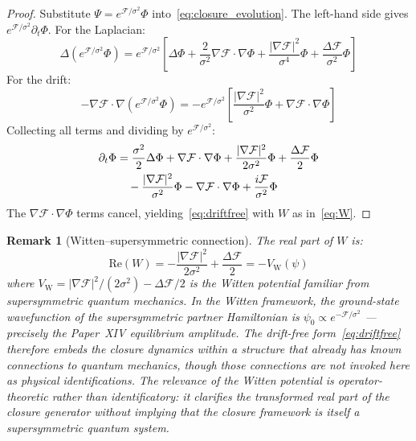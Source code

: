 \documentclass[12pt]{article}
\newtheorem{remark}[theorem]{Remark}
\newcommand{\Fcal}{\mathcal{F}}
\begin{document}
\begin{proof}
Substitute $\Psi = e^{\Fcal/\sigma^2}\Phi$ into~\eqref{eq:closure_evolution}. The left-hand side gives $e^{\Fcal/\sigma^2}\partial_t\Phi$. For the Laplacian:
\begin{equation}
    \Delta(e^{\Fcal/\sigma^2}\Phi) = e^{\Fcal/\sigma^2}\!\left[\Delta\Phi + \frac{2}{\sigma^2}\nabla\Fcal\cdot\nabla\Phi + \frac{|\nabla\Fcal|^2}{\sigma^4}\Phi + \frac{\Delta\Fcal}{\sigma^2}\Phi\right]
\end{equation}
For the drift:
\begin{equation}
    -\nabla\Fcal\cdot\nabla(e^{\Fcal/\sigma^2}\Phi) = -e^{\Fcal/\sigma^2}\!\left[\frac{|\nabla\Fcal|^2}{\sigma^2}\Phi + \nabla\Fcal\cdot\nabla\Phi\right]
\end{equation}
Collecting all terms and dividing by $e^{\Fcal/\sigma^2}$:
\begin{align}
    \partial_t\Phi &= \frac{\sigma^2}{2}\Delta\Phi + \nabla\Fcal\cdot\nabla\Phi + \frac{|\nabla\Fcal|^2}{2\sigma^2}\Phi + \frac{\Delta\Fcal}{2}\Phi \notag \\
    &\quad - \frac{|\nabla\Fcal|^2}{\sigma^2}\Phi - \nabla\Fcal\cdot\nabla\Phi + \frac{i\Fcal}{\sigma^2}\Phi
\end{align}
The $\nabla\Fcal\cdot\nabla\Phi$ terms cancel, yielding~\eqref{eq:driftfree} with $W$ as in~\eqref{eq:W}.
\end{proof}

\begin{remark}[Witten--supersymmetric connection]\label{rem:witten}
The real part of $W$ is:
\begin{equation}
    \mathrm{Re}(W) = -\frac{|\nabla\Fcal|^2}{2\sigma^2} + \frac{\Delta\Fcal}{2} = -V_{\mathrm{W}}(\psi)
\end{equation}
where $V_{\mathrm{W}} = |\nabla\Fcal|^2/(2\sigma^2) - \Delta\Fcal/2$ is the \textit{Witten potential} familiar from supersymmetric quantum mechanics. In the Witten framework, the ground-state wavefunction of the supersymmetric partner Hamiltonian is $\psi_0 \propto e^{-\Fcal/\sigma^2}$ --- precisely the Paper~XIV equilibrium amplitude. The drift-free form~\eqref{eq:driftfree} therefore embeds the closure dynamics within a structure that already has known connections to quantum mechanics, though those connections are not invoked here as physical identifications. The relevance of the Witten potential is operator-theoretic rather than identificatory: it clarifies the transformed real part of the closure generator without implying that the closure framework is itself a supersymmetric quantum system.
\end{remark}
\end{document}
